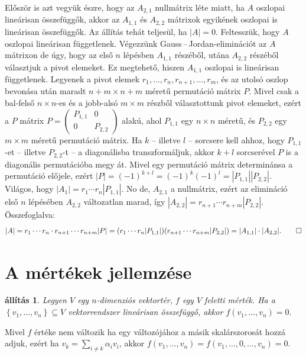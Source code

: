 \documentclass[a4paper, showtrims]{memoir}
\makeatletter
\renewenvironment{proof}[1][\proofname]
    {\par\pushQED{\qed}%
    \normalfont \topsep6\p@\@plus6\p@\relax
    \trivlist
    \item[\hskip\labelsep
        \itshape
    #1\@addpunct{:}]\ignorespaces}
    {\popQED\endtrivlist\@endpefalse}
\theoremstyle{plain}
\newtheorem{proposition}{állítás}[chapter]
\theoremstyle{remark}
\theoremstyle{definition}
\makeatother
\begin{document}
\begin{proof}[Gauss\,--\,Jordan-elimináció alapján]
	Először is azt vegyük észre, hogy az $A_{2,1}$ nullmátrix léte miatt,
	ha $A$ oszlopai lineárisan összefüggők,
	akkor az $A_{1,1}$ és $A_{2,2}$ mátrixok egyikének oszlopai is lineárisan összefüggők.
	Az állítás tehát teljesül, ha $|A|=0$.
	Feltesszük, hogy $A$ oszlopai lineárisan függetlenek.
	Végezzünk Gauss\,--\,Jordan-eliminációt az $A$ mátrixon de úgy,
	hogy az első $n$ lépésben $A_{1,1}$ részéből, utána $A_{2,2}$ részéből választjuk a pivot elemeket.
	Ez megtehető, hiszen $A_{1,1}$ oszlopai is lineárisan függetlenek.
	Legyenek a pivot elemek $r_1,\ldots,r_n,r_{n+1},\ldots,r_m$,
	és az utolsó oszlop bevonása után maradt $n+m\times n+m$ méretű permutáció mátrix $P$.
	Mivel csak a bal-felső $n\times n$-es és a jobb-alsó $m\times m$ részből választottunk pivot elemeket,
	ezért a $P$ mátrix
	\begin{math}
		P=
		\begin{pmatrix}
			P_{1,1} & 0       \\
			0       & P_{2,2}
		\end{pmatrix}
	\end{math}
	alakú, ahol $P_{1,1}$ egy $n\times n$ méretű,
	és $P_{2,2}$ egy $m\times m$ méretű permutáció mátrix.
	Ha $k$ -- illetve $l$ -- sorcsere kell ahhoz,
	hogy $P_{1,1}$-et -- illetve $P_{2,2}$-t -- a diagonálisba transzformáljuk,
	akkor $k+l$ sorcserével $P$ is a diagonális permutációba megy át.
	Mivel egy permutáció mátrix determinánsa a permutáció előjele, ezért
	\(
	|P|=(-1)^{k+l}=\left( -1 \right)^k\left( -1 \right)^l=|P_{1,1}||P_{2,2}|.
	\)
	Világos, hogy $|A_1|=r_1\cdots r_n|P_{1,1}|$.
	No de, $A_{2,1}$ a nullmátrix, ezért az elimináció első $n$ lépésében $A_{2,2}$ változatlan marad,
	így $|A_{2,2}|=r_{n+1}\cdots r_{n+m}|P_{2,2}|$.
	Összefoglalva:
	\[
		|A|
		=r_1\cdots r_n\cdot r_{n+1}\cdots r_{n+m}|P|
		=(r_1\cdots r_n|P_{1,1}|)(r_{n+1}\cdots r_{n+m}|P_{2,2}|)
		=|A_{1,1}|\cdot|A_{2,2}|.\qedhere
	\]
\end{proof}

\section{A mértékek jellemzése}

\begin{proposition}
	Legyen $V$ egy $n$-dimenziós vektortér, $f$ egy $V$ feletti mérték.
	Ha a $\left\{ v_{1},\ldots ,v_{n}\right\} \subseteq V$ vektorrendszer lineárisan összefüggő,
	akkor
	\(
	f\left( v_{1},\ldots ,v_{n}\right) =0.
	\)
\end{proposition}
\begin{proof}
	Mivel $f$ értéke nem változik ha egy változójához a másik skalárszorosát hozzá adjuk,
	ezért ha $v_{k}=\sum_{i\neq k}\alpha _{i}v_{i}$,
	akkor
	$f\left(v_{1},\ldots ,v_{n}\right)
		=
		f\left( v_{1},\ldots ,0,\ldots ,v_{n}\right)
		=
		0$.
\end{proof}
\end{document}

